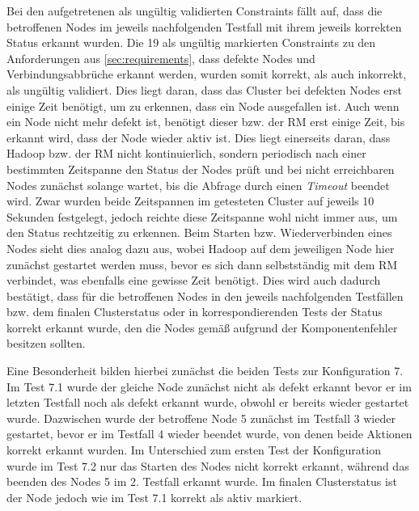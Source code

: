 Bei den aufgetretenen als ungültig validierten Constraints fällt auf, dass die betroffenen Nodes im jeweils nachfolgenden \gls{Testfall} mit ihrem jeweils korrekten Status erkannt wurden.
Die 19 als ungültig markierten Constraints zu den Anforderungen aus \cref{sec:requirements}, dass defekte Nodes und Verbindungsabbrüche erkannt werden, wurden somit korrekt, als auch inkorrekt, als ungültig validiert.
Dies liegt daran, dass das Cluster bei defekten Nodes erst einige Zeit benötigt, um zu erkennen, dass ein Node ausgefallen ist.
Auch wenn ein Node nicht mehr defekt ist, benötigt dieser bzw. der \gls{RM} erst einige Zeit, bis erkannt wird, dass der Node wieder aktiv ist.
Dies liegt einerseits daran, dass Hadoop bzw. der \gls{RM} nicht kontinuierlich, sondern periodisch nach einer bestimmten Zeitspanne den Status der Nodes prüft und bei nicht erreichbaren Nodes zunächst solange wartet, bis die Abfrage durch einen \emph{Timeout} beendet wird.
Zwar wurden beide Zeitspannen im getesteten Cluster auf jeweils 10 Sekunden festgelegt, jedoch reichte diese Zeitspanne wohl nicht immer aus, um den Status rechtzeitig zu erkennen.
Beim Starten bzw. Wiederverbinden eines Nodes sieht dies analog dazu aus, wobei Hadoop auf dem jeweiligen Node hier zunächst gestartet werden muss, bevor es sich dann selbstständig mit dem \gls{RM} verbindet, was ebenfalls eine gewisse Zeit benötigt.
Dies wird auch dadurch bestätigt, dass für die betroffenen Nodes in den jeweils nachfolgenden Testfällen bzw. dem finalen Clusterstatus oder in korrespondierenden \glspl{Test} der Status korrekt erkannt wurde, den die Nodes gemäß aufgrund der Komponentenfehler besitzen sollten.

Eine Besonderheit bilden hierbei zunächst die beiden \glspl{Test} zur Konfiguration 7.
Im \gls{Test} 7.1 wurde der gleiche Node zunächst nicht als defekt erkannt bevor er im letzten \gls{Testfall} noch als defekt erkannt wurde, obwohl er bereits wieder gestartet wurde.
Dazwischen wurde der betroffene Node 5 zunächst im \gls{Testfall} 3 wieder gestartet, bevor er im \gls{Testfall} 4 wieder beendet wurde, von denen beide Aktionen korrekt erkannt wurden.
Im Unterschied zum ersten \gls{Test} der Konfiguration wurde im \gls{Test} 7.2 nur das Starten des Nodes nicht korrekt erkannt, während das beenden des Nodes 5 im 2. \gls{Testfall} erkannt wurde.
Im finalen Clusterstatus ist der Node jedoch wie im \gls{Test} 7.1 korrekt als aktiv markiert.

